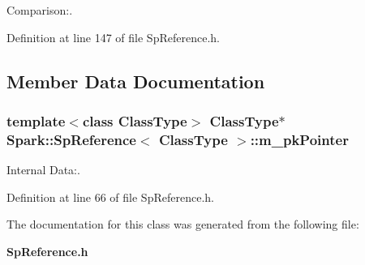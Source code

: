 Comparison:. 

Definition at line 147 of file Sp\-Reference.h.

\subsection{Member Data Documentation}
\subsubsection{\setlength{\rightskip}{0pt plus 5cm}template$<$class Class\-Type$>$ Class\-Type$\ast$ {\bf Spark::Sp\-Reference}$<$ Class\-Type $>$::{\bf m\_\-pk\-Pointer}\hspace{0.3cm}{\tt  [protected]}}\label{classSpark_1_1SpReference_p0}


Internal Data:. 

Definition at line 66 of file Sp\-Reference.h.

The documentation for this class was generated from the following file:\begin{CompactItemize}
\item 
{\bf Sp\-Reference.h}\end{CompactItemize}
